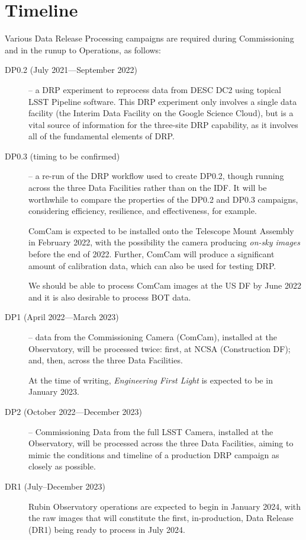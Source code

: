 \section{Timeline}

Various Data Release Processing campaigns are required during Commissioning and in the runup to Operations, as follows:

\begin{description}

\item [DP0.2 (July 2021—September 2022)] -- a DRP experiment to reprocess data from DESC DC2 using topical LSST Pipeline software. This DRP experiment only involves a single data facility (the Interim Data Facility on the Google Science Cloud), but is a vital source of information for the three-site DRP capability, as it involves all of the fundamental elements of DRP.

\item [DP0.3 (timing to be confirmed)] -- a re-run of the DRP workflow used to create DP0.2, though running across the three Data Facilities rather than on the IDF. It will be worthwhile to compare the properties of the DP0.2 and DP0.3 campaigns, considering efficiency, resilience, and effectiveness, for example.

  ComCam is expected to be installed onto the Telescope Mount Assembly in February 2022, with the possibility the camera producing {\em on-sky images} before the end of 2022. Further, ComCam will produce a significant amount of calibration data, which can also be used for testing DRP.

  We should be able to process ComCam images at the US DF by June 2022 and it is also desirable to process BOT data.  
  
\item [DP1 (April 2022—March 2023)] -- data from the Commissioning Camera (ComCam), installed at the Observatory, will be processed twice: first, at NCSA (Construction DF); and, then, across the three Data Facilities.

  At the time of writing, {\em Engineering First Light} is expected to be in January 2023.

\item [DP2 (October 2022—December 2023)] -- Commissioning Data from the full LSST Camera, installed at the Observatory, will be processed across the three Data Facilities, aiming to mimic the conditions and timeline of a production DRP campaign as closely as possible.

\item [DR1 (July--December 2023)] Rubin Observatory operations are expected to begin in January 2024, with the raw images that will constitute the first, in-production, Data Release (DR1) being ready to process in July 2024.

\end{description}

